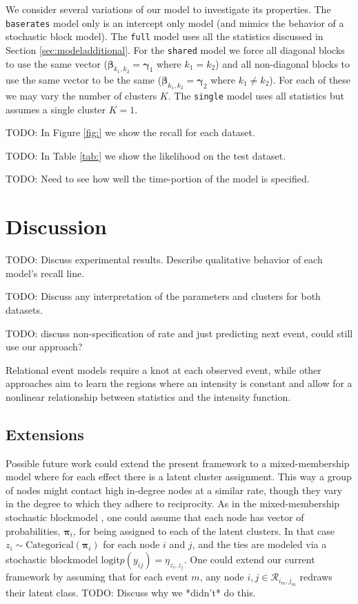 \documentclass[11pt]{article}
\begin{document}
We consider several variations of our model to investigate its properties. The \texttt{baserates} model only is an intercept only model (and mimics the behavior of a stochastic block model).   The \texttt{full} model uses all the statistics discussed in Section \ref{sec:modeladditional}.  For the \texttt{shared} model we force all diagonal blocks to use the same vector ($\boldsymbol{\beta}_{k_1,k_2} = \boldsymbol{\gamma}_1$ where $k_1=k_2$) and all non-diagonal blocks to use the same vector to be the same  ($\boldsymbol{\beta}_{k_1,k_2} = \boldsymbol{\gamma}_2$ where $k_1 \ne k_2$).  For each of these we may vary the number of clusters $K$. The \texttt{single} model uses all statistics but assumes a single cluster $K=1$. 

TODO: In Figure \ref{fig:} we show the recall for each dataset.

TODO: In Table \ref{tab:} we show the likelihood on the test dataset.

TODO: Need to see how well the time-portion of the model is specified.

\section{Discussion}

TODO: Discuss experimental results.  Describe qualitative behavior of each model's recall line.

TODO: Discuss any interpretation of the parameters and clusters for both datasets.

TODO: discuss non-specification of rate and just predicting next
event, could still use our approach?

Relational event models \cite{Butts2008} require a knot at each observed event, while other approaches \cite{Gunawardana2011} aim to learn the regions where an intensity is constant and allow for a nonlinear relationship between statistics and the intensity function.  

\subsection{Extensions}
Possible future work could extend the present framework to a mixed-membership model where for each effect there is a latent cluster assignment.  This way a group of nodes might contact high in-degree nodes at a similar rate, though they vary in the degree to which they adhere to reciprocity.  As in the mixed-membership stochastic blockmodel \cite{Airoldi2008,Shafiei2010}, one could assume that each node has vector of probabilities, $\boldsymbol{\pi}_i$, for being assigned to each of the latent clusters.  In that case $z_i \sim \mbox{Categorical}(\boldsymbol{\pi}_i)$ for each node $i$ and $j$, and the ties are modeled via a stochastic blockmodel $\mbox{logit} p(y_{ij}) = \eta_{z_i,z_j}$.  One could extend our current framework by assuming that for each event $m$, any node  $i,j \in \mathcal{R}_{i_m,j_m}$ redraws their latent class.  TODO: Discuss why we *didn't* do this.
\end{document}
